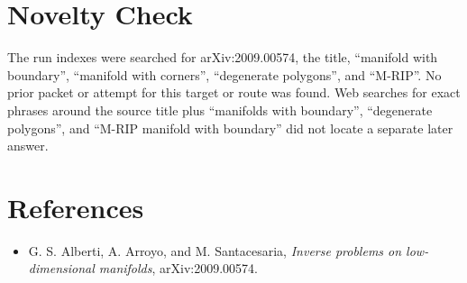 \documentclass[11pt]{article}
\begin{document}
\section{Novelty Check}

The run indexes were searched for arXiv:2009.00574, the title, ``manifold with boundary'', ``manifold with corners'', ``degenerate polygons'', and ``M-RIP''.  No prior packet or attempt for this target or route was found.  Web searches for exact phrases around the source title plus ``manifolds with boundary'', ``degenerate polygons'', and ``M-RIP manifold with boundary'' did not locate a separate later answer.

\section{References}

\begin{itemize}
\item G. S. Alberti, A. Arroyo, and M. Santacesaria, \emph{Inverse problems on low-dimensional manifolds}, arXiv:2009.00574.
\end{itemize}
\end{document}
